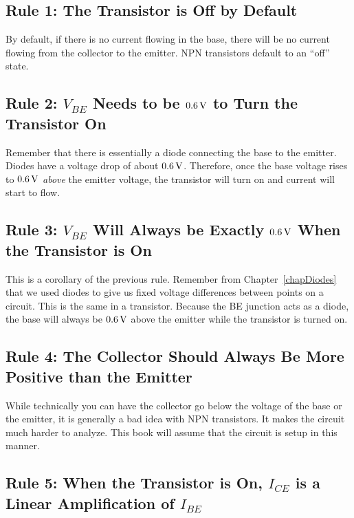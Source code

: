 \subsection*{Rule 1: The Transistor is Off by Default}

By default, if there is no current flowing in the base, there will be no current flowing from the collector to the emitter.
NPN transistors default to an ``off'' state.

\subsection*{Rule 2: $V_{BE}$ Needs to be $0.6\,\si{\volt}$ to Turn the Transistor On}

Remember that there is essentially a diode connecting the base to the emitter.
Diodes have a voltage drop of about $0.6\,\si{\volt}$.  
Therefore, once the base voltage rises to $0.6\,\si{\volt}$ \emph{above} the emitter voltage, the transistor will turn on and current will start to flow.

\subsection*{Rule 3: $V_{BE}$ Will Always be Exactly $0.6\,\si{\volt}$ When the Transistor is On}

This is a corollary of the previous rule.
Remember from Chapter~\ref{chapDiodes} that we used diodes to give us fixed voltage differences between points on a circuit.
This is the same in a transistor.
Because the BE junction acts as a diode, the base will always be $0.6\,\si{\volt}$ above the emitter while the transistor is turned on.

\subsection*{Rule 4: The Collector Should Always Be More Positive than the Emitter}

While technically you can have the collector go below the voltage of the base or the emitter, it is generally a bad idea with NPN transistors.
It makes the circuit much harder to analyze.
This book will assume that the circuit is setup in this manner.

\subsection*{Rule 5: When the Transistor is On, $I_{CE}$ is a Linear Amplification of $I_{BE}$}

